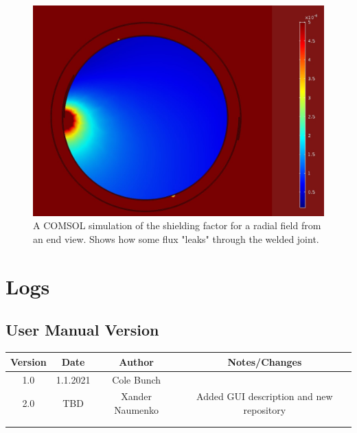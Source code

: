 \documentclass{TheMartianReport}
\begin{document}
\begin{figure}[h]
	\centering
	\includegraphics[scale=0.35]{end_sim}
	\caption{A COMSOL simulation of the shielding factor for a radial field from an end view. Shows how some flux "leaks" through the welded joint.}
	\label{fig:EndSim}
\end{figure}

\pagebreak[18]

\section{Logs}

\subsection{User Manual Version}
\begin{table}[h]
	\centering
	\begin{tabular}{|c|c|c|c|}
		\hline
		\textbf{Version} & \textbf{Date} & \textbf{Author} & \textbf{Notes/Changes} \\
		\hline
		1.0 & 1.1.2021 & Cole Bunch &  \\
		\hline
		2.0 & TBD & Xander Naumenko &  Added GUI description and new repository\\
		\hline
		&  &  &  \\
		\hline
		&  &  &  \\
		\hline
	\end{tabular}
	\label{log:ManVer}
\end{table}
\end{document}
